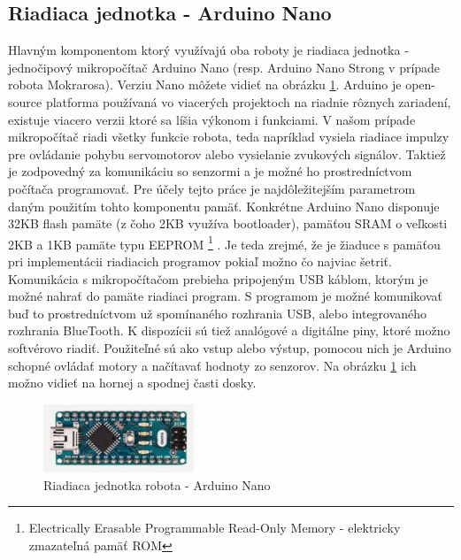 \subsection{Riadiaca jednotka - Arduino Nano}
Hlavným komponentom ktorý využívajú oba roboty je riadiaca jednotka - jednočipový mikropočítač Arduino Nano (resp. Arduino Nano Strong v prípade robota Mokrarosa). Verziu Nano môžete vidieť na obrázku \ref{obr:arduino}. Arduino je open-source platforma používaná vo viacerých projektoch na riadnie rôznych zariadení, existuje viacero verzii ktoré sa líšia výkonom i funkciami. \cite{ArduinoConcept} V našom prípade mikropočítač riadi všetky funkcie robota, teda napríklad vysiela riadiace impulzy pre ovládanie pohybu servomotorov alebo vysielanie zvukových signálov. Taktiež je zodpovedný za komunikáciu so senzormi a je možné ho prostredníctvom počítača programovať. Pre účely tejto práce je najdôležitejším parametrom daným použitím tohto komponentu pamäť. Konkrétne Arduino Nano disponuje 32KB flash pamäte (z čoho 2KB využíva bootloader), pamäťou SRAM  o veľkosti 2KB a 1KB pamäte typu EEPROM \footnote{Electrically Erasable Programmable Read-Only Memory - elektricky zmazateľná pamäť ROM} \cite{ArduinoNanoSpecification}. Je teda zrejmé, že je žiaduce s pamäťou pri implementácii riadiacich programov pokiaľ možno čo najviac šetriť. Komunikácia s mikropočítačom prebieha pripojeným USB káblom, ktorým je možné nahrať do pamäte riadiaci program. S programom je možné komunikovať buď to prostredníctvom už spomínaného rozhrania USB, alebo integrovaného rozhrania BlueTooth. K dispozícii sú tiež analógové a digitálne piny, ktoré možno softvérovo riadiť. Použiteľné sú ako vstup alebo výstup, pomocou nich je Arduino schopné ovládať motory a načítavať hodnoty zo senzorov. Na obrázku \ref{obr:arduino} ich možno vidieť na hornej a spodnej časti dosky.

\begin{figure}
\centerline{\includegraphics[width=0.4\textwidth]{images/arduino-nano}}
\caption[Riadiaca jednotka - Arduino Nano]{Riadiaca jednotka robota - Arduino Nano}
\label{obr:arduino}
\end{figure}

